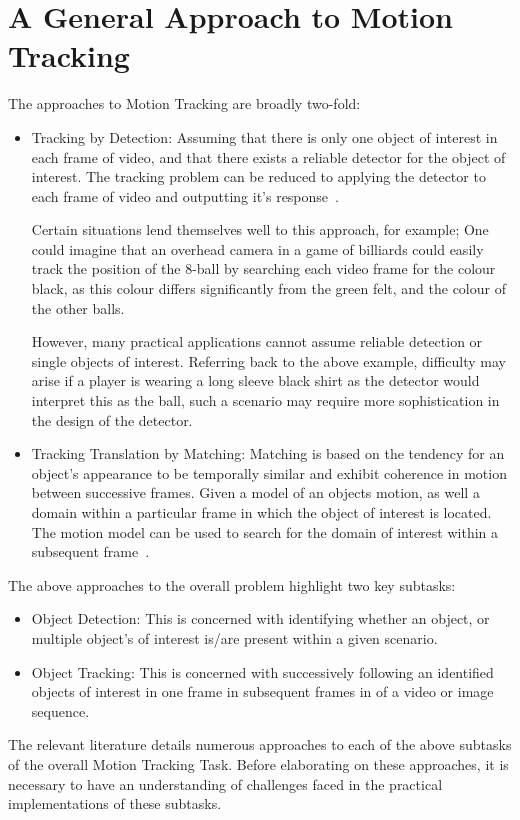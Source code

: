 \section{A General Approach to Motion Tracking}\label{literature_review_general_approach}
The approaches to Motion Tracking are broadly two-fold:
\begin{itemize}
    \item Tracking by Detection:
        Assuming that there is only one object of interest in each frame of
        video, and that there exists a reliable detector for the object of
        interest. The tracking problem can be reduced to applying the detector
        to each frame of video and outputting it's response~\cite{Forsyth2012}.

        Certain situations lend themselves well to this approach, for example;
        One could imagine that an overhead camera in a game of billiards could
        easily track the position of the 8-ball by searching each video frame
        for the colour black, as this colour differs significantly from the
        green felt, and the colour of the other balls.
        
        However, many practical applications cannot assume reliable detection or
        single objects of interest. Referring back to the above example,
        difficulty may arise if a player is wearing a long sleeve black shirt as
        the detector would interpret this as the ball, such a scenario may
        require more sophistication in the design of the detector.

    \item Tracking Translation by Matching:
        Matching is based on the tendency for an object's appearance to be
        temporally similar and exhibit coherence in motion between successive
        frames.
        Given a model of an objects motion, as well a domain within a particular
        frame in which the object of interest is located. The motion model can
        be used to search for the domain of interest within a subsequent frame~\cite{Forsyth2012}.
\end{itemize}   

The above approaches to the overall problem highlight two key subtasks:
    \begin{itemize}
        \item Object Detection: This is concerned with identifying whether an
            object, or multiple object's of interest is/are present within a
            given scenario.
        \item Object Tracking: This is concerned with successively following an
            identified objects of interest in one frame in subsequent frames in
            of a video or image sequence.  
    \end{itemize}
The relevant literature details numerous approaches to each of the above
subtasks of the overall Motion Tracking Task. Before elaborating on these
approaches, it is necessary to have an understanding of challenges faced in
the practical implementations of these subtasks.

